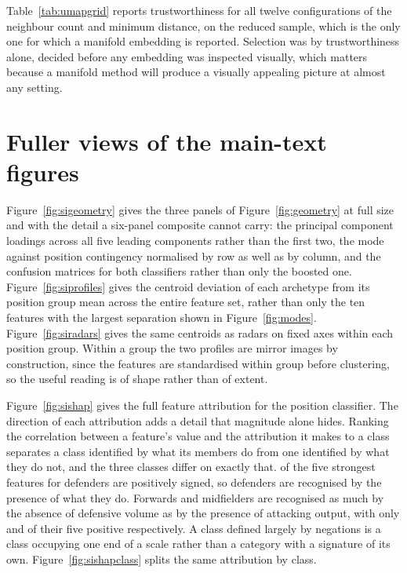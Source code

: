 Table~\ref{tab:umapgrid} reports trustworthiness for all twelve configurations of the neighbour
count and minimum distance, on the reduced sample, which is the only one for which a manifold
embedding is reported. Selection was by trustworthiness alone, decided before any embedding was
inspected visually, which matters because a manifold method will produce a visually appealing
picture at almost any setting.





\section{Fuller views of the main-text figures}
\label{sec:si:profiles}

Figure~\ref{fig:sigeometry} gives the three panels of Figure~\ref{fig:geometry} at full size and
with the detail a six-panel composite cannot carry: the principal component loadings across all
five leading components rather than the first two, the mode against position contingency
normalised by row as well as by column, and the confusion matrices for both classifiers rather
than only the boosted one. Figure~\ref{fig:siprofiles} gives the centroid deviation of each archetype from its position
group mean across the entire feature set, rather than only the ten features with the largest
separation shown in Figure~\ref{fig:modes}. Figure~\ref{fig:siradars} gives the same centroids
as radars on fixed axes within each position group. Within a group the two profiles are mirror
images by construction, since the features are standardised within group before clustering, so
the useful reading is of shape rather than of extent.

Figure~\ref{fig:sishap} gives the full feature attribution for the position classifier. The
direction of each attribution adds a detail that magnitude alone hides. Ranking the correlation
between a feature's value and the attribution it makes to a class separates a class identified
by what its members do from one identified by what they do not, and the three classes differ on
exactly that. \ShapPresenceDF{} of the five strongest features for defenders are positively
signed, so defenders are recognised by the presence of what they do. Forwards and midfielders
are recognised as much by the absence of defensive volume as by the presence of attacking
output, with only \ShapPresenceFW{} and \ShapPresenceMF{} of their five positive respectively.
A class defined largely by negations is a class occupying one end of a scale rather than a
category with a signature of its own. Figure~\ref{fig:sishapclass} splits the same attribution
by class.

